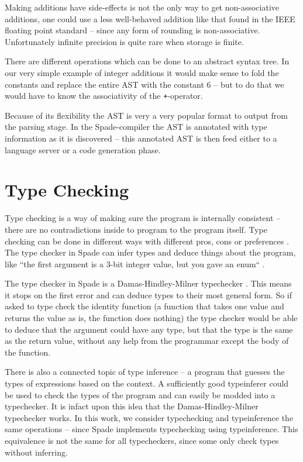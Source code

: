 Making additions have side-effects is not the only way to get non-associative additions, one could use a less well-behaved addition like that found in the IEEE floating point standard -- since any form of rounding is non-associative. Unfortunately infinite precision is quite rare when storage is finite.

There are different operations which can be done to an abstract syntax tree. In our very simple example of integer additions it would make sense to fold the constants and replace the entire AST with the constant 6 -- but to do that we would have to know the associativity of the \verb!+!-operator.

Because of its flexibility the AST is very a very popular format to output from the parsing stage. In the Spade-compiler the AST is annotated with type information as it is discovered -- this annotated AST is then feed either to a language server or a code generation phase.

\section{Type Checking} %
\label{sec:TypeChecking}
Type checking is a way of making sure the program is internally consistent -- there are no contradictions inside to program to the program itself. Type checking can be done in different ways with different pros, cons or preferences \cite{src:TypeCheckersBook}. The type checker in Spade can infer types and deduce things about the program, like ``the first argument is a 3-bit integer value, but you gave an enum`` \cite{src:spadeAnHDL}.

The type checker in Spade is a Damas-Hindley-Milner typechecker \cite{src:DamasHindleyMilner}. This means it stops on the first error and can deduce types to their most general form. So if asked to type check the identity function (a function that takes one value and returns the value as is, the function does nothing) the type checker would be able to deduce that the argument could have any type, but that the type is the same as the return value, without any help from the programmar except the body of the function. \cite{src:DamasHindleyMilner}

There is also a connected topic of type inference -- a program that guesses the types of expressions based on the context. A sufficiently good typeinferer could be used to check the types of the program and can easily be modded into a typechecker. It is infact upon this idea that the Damas-Hindley-Milner typechecker works. In this work, we consider typechecking and typeinference the same operations -- since Spade implements typechecking using typeinference. This equivalence is not the same for all typecheckers, since some only check types without inferring.

